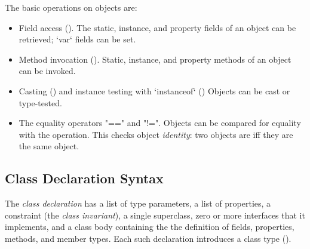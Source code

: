 The basic operations on objects are:
\begin{itemize}

{}\item Field access (). 
The static, instance, and property fields of an object can be retrieved; \xcd`var` fields
can be set.  

{}\item Method invocation ().  
Static, instance, and property methods of an object can be invoked.

{}\item Casting () and instance testing with \xcd`instanceof`
() Objects can be cast or type-tested.  

\item The equality operators \xcd"==" and \xcd"!=".  
Objects can be compared for equality with the \Xcd{==} operation.  This checks
object {\em identity}: two objects are \Xcd{==} iff they are the same object.

\end{itemize}

  

\subsection{Class Declaration Syntax}

The {\em class declaration} has a list of type parameters, a list of
properties, a constraint (the {\em class invariant}), a single superclass,
zero or more interfaces that it implements, and a class body containing the
the definition of fields, properties, methods, and member types. Each such
declaration introduces a class type ().

